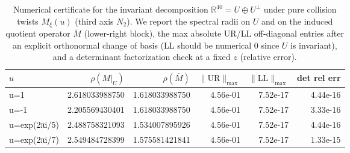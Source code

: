 \begin{table}[H]
\centering
\scriptsize
\setlength{\tabcolsep}{6pt}
\caption{Numerical certificate for the invariant decomposition $\mathbb R^{40}=U\oplus U^\perp$ under pure collision twists $M_\xi(u)$ (third axis $N_2$). We report the spectral radii on $U$ and on the induced quotient operator $\overline M$ (lower-right block), the max absolute UR/LL off-diagonal entries after an explicit orthonormal change of basis (LL should be numerical $0$ since $U$ is invariant), and a determinant factorization check at a fixed $z$ (relative error).}
\label{tab:real_input_40_pure_collision_block_factorization}
\begin{tabular}{l r r r r r}
\toprule
$u$ & $\rho(M|_U)$ & $\rho(\overline M)$ & $\|\mathrm{UR}\|_{\max}$ & $\|\mathrm{LL}\|_{\max}$ & det rel err\\
\midrule
u=1 & 2.618033988750 & 1.618033988750 & 4.56e-01 & 7.52e-17 & 4.44e-16\\
u=-1 & 2.205569430401 & 1.618033988750 & 4.56e-01 & 7.52e-17 & 3.33e-16\\
u=exp(2πi/5) & 2.488758321093 & 1.534007895926 & 4.56e-01 & 7.52e-17 & 4.44e-16\\
u=exp(2πi/7) & 2.549484728399 & 1.575581421841 & 4.56e-01 & 7.52e-17 & 1.33e-15\\
\bottomrule
\end{tabular}
\end{table}
